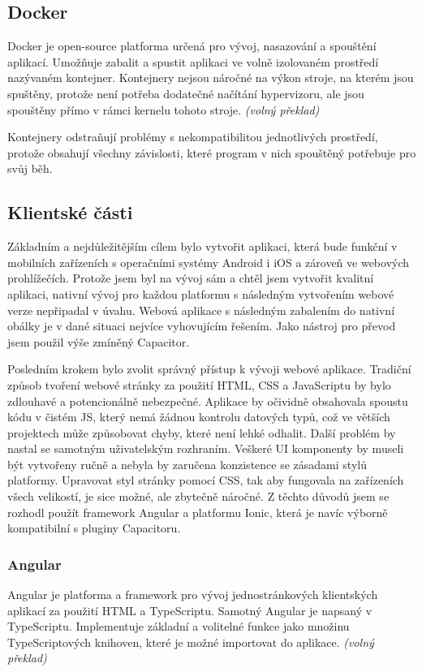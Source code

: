 \documentclass[
  glossaries,
]{kidiplom}
\begin{document}
\subsection{Docker}
Docker je open-source platforma určená pro vývoj, nasazování a spouštění aplikací. Umožňuje zabalit a spustit aplikaci ve volně izolovaném prostředí nazývaném kontejner. Kontejnery nejsou náročné na výkon stroje, na kterém jsou spuštěny, protože není potřeba dodatečné načítání hypervizoru, ale jsou spouštěny přímo v rámci kernelu tohoto stroje. \cite{8} \textit{(volný překlad)} 


Kontejnery odstraňují problémy s nekompatibilitou jednotlivých prostředí, protože obsahují všechny závislosti, které program v nich spouštěný potřebuje pro svůj běh.
 
\subsection{Klientské části}
Základním a nejdůležitějším cílem bylo vytvořit aplikaci, která bude funkční v mobilních zařízeních s operačními systémy Android i iOS a zároveň ve webových prohlížečích. Protože jsem byl na vývoj sám a chtěl jsem vytvořit kvalitní aplikaci, nativní vývoj pro každou platformu s následným vytvořením webové verze nepřipadal v úvahu. Webová aplikace s následným zabalením do nativní obálky je v dané situaci nejvíce vyhovujícím řešením. Jako nástroj pro převod jsem použil výše zmíněný Capacitor. 

Posledním krokem bylo zvolit správný přístup k vývoji webové aplikace. Tradiční způsob tvoření webové stránky za použití HTML, CSS a JavaScriptu by bylo zdlouhavé a potencionálně nebezpečné. Aplikace by očividně obsahovala spoustu kódu v čistém JS, který nemá žádnou kontrolu datových typů, což ve větších projektech může způsobovat chyby, které není lehké odhalit. Další problém by nastal se samotným uživatelským rozhraním. Veškeré UI komponenty by museli být vytvořeny ručně a nebyla by zaručena konzistence se zásadami stylů platformy. Upravovat styl stránky pomocí CSS, tak aby fungovala na zařízeních všech velikostí, je sice možné, ale zbytečně náročné. Z těchto důvodů jsem se rozhodl použít framework Angular a platformu Ionic, která je navíc výborně kompatibilní s pluginy Capacitoru.

\subsubsection{Angular}
\label{sec:angular}
Angular je platforma a framework pro vývoj jednostránkových klientských aplikací za použití HTML a TypeScriptu. Samotný Angular je napsaný v TypeScriptu. Implementuje základní a volitelné funkce jako množinu TypeScriptových knihoven, které je možné importovat do aplikace. \cite{9} \textit{(volný překlad)} 
\end{document}
